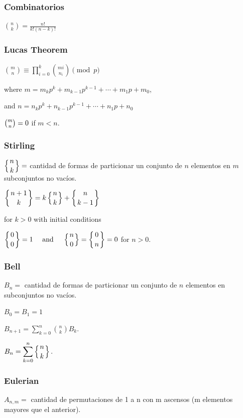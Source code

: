 {{\subsubsection{Combinatorios}
{
\(\displaystyle \binom{n}{k} = \frac{n!}{k!(n-k)!} \)
}

\subsubsection{Lucas Theorem}
{
    \(\displaystyle {\binom {m}{n}}\equiv \prod_{i=0}^{k}{\binom {m{i}}{n_{i}}}{\pmod{p}}\)

where \({\displaystyle m=m_{k}p^{k}+m_{k-1}p^{k-1}+\cdots +m_{1}p+m_{0},}\)

and \({\displaystyle n=n_{k}p^{k}+n_{k-1}p^{k-1}+\cdots +n_{1}p+n_{0}}\)

\({\displaystyle {\tbinom {m}{n}}=0}\) if \(m < n\).


}
\subsubsection{Stirling}
{
\(\displaystyle \left\{{n \atop k}\right\} = \) cantidad de formas de particionar un conjunto de \(n\) elementos en \(m\) subconjuntos no vacíos.

\(\displaystyle \left\{{n+1\atop k}\right\} = k \left\{{ n \atop k }\right\} + \left\{{n\atop k-1}\right\}\)

for \(k > 0\) with initial conditions

\({\displaystyle \left\{{0 \atop 0}\right\}=1\quad {\mbox{ and }}\quad \left\{{n \atop 0}\right\}=\left\{{0 \atop n}\right\}=0}\)
for \(n > 0\).


}
\subsubsection{Bell}
{
\( {\displaystyle B_{n}=} \) cantidad de formas de particionar un conjunto de \(n\) elementos en subconjuntos no vacíos.

\( {\displaystyle B_0= B_1 = 1} \)

\( {\displaystyle B_{n+1}=\sum_{k=0}^{n} \binom{n}{k} B_k.} \) 

\( {\displaystyle B_{n}=\sum _{k=0}^{n}\left\{{n \atop k}\right\}.} \) 


} 
\subsubsection{Eulerian}
{
\( {\displaystyle A_{n, m}=} \) cantidad de permutaciones de 1 a n con m ascensos (m elementos mayores que el anterior).

}}}
